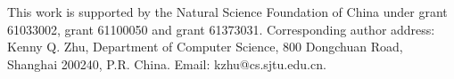 \documentclass[prodmode,acmtkdd]{acmsmall} %
\begin{document}


\maketitle
\begin{bottomstuff}
This work is supported by the Natural Science Foundation of
China under grant 61033002, grant 61100050 and grant 61373031.
Corresponding author address: Kenny Q. Zhu, Department of Computer Science, 
800 Dongchuan Road, Shanghai 200240, P.R. China. Email: kzhu@cs.sjtu.edu.cn.
\end{bottomstuff}










\end{document}
